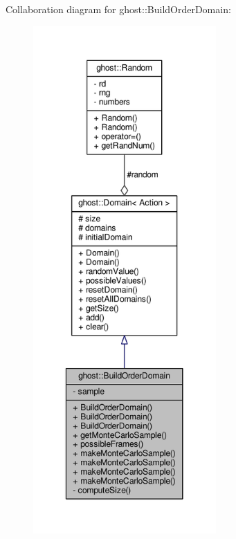 Collaboration diagram for ghost\-:\-:Build\-Order\-Domain\-:
\nopagebreak
\begin{figure}[H]
\begin{center}
\leavevmode
\includegraphics[height=550pt]{classghost_1_1BuildOrderDomain__coll__graph}
\end{center}
\end{figure}
